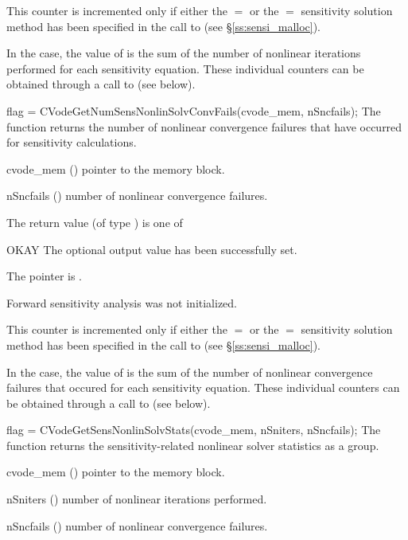 {
  This counter is incremented only if either the $=$ or 
  the $=$ sensitivity solution method has been specified 
  in the call to  (see \S\ref{ss:sensi_malloc}).
  
  In the  case, the value of  is the sum of 
  the number of nonlinear iterations performed for each sensitivity equation.
  These individual counters can be obtained through a call to
   (see below).
}
{
  flag = CVodeGetNumSensNonlinSolvConvFails(cvode\_mem, nSncfails);
}
{
  The function  returns the
  number of nonlinear convergence failures that have occurred for
  sensitivity calculations.
}
{
  \begin{args}
  \item[cvode\_mem] ()
    pointer to the {\cvodes} memory block.
  \item[nSncfails] ()
    number of nonlinear convergence failures.
  \end{args}
}
{
  The return value  (of type ) is one of
  \begin{args}
  \item[OKAY] 
    The optional output value has been successfully set.
  \item[\Id{CVG\_NO\_MEM}]
    The  pointer is .
  \item[\Id{CVG\_NO\_SENS}]
    Forward sensitivity analysis was not initialized.
  \end{args}
}
{
  This counter is incremented only if either the $=$ or 
  the $=$ sensitivity solution method has been specified 
  in the call to  (see \S\ref{ss:sensi_malloc}).
  
  In the  case, the value of  is the sum of 
  the number of nonlinear convergence failures that occured for each sensitivity equation.
  These individual counters can be obtained through a call to
   (see below).
}
{
  flag = CVodeGetSensNonlinSolvStats(cvode\_mem, nSniters, nSncfails);
}
{
  The function  returns the sensitivity-related
  nonlinear solver statistics as a group.
}
{
  \begin{args}
  \item[cvode\_mem] ()
    pointer to the {\cvodes} memory block.
  \item[nSniters] ()
    number of nonlinear iterations performed.
  \item[nSncfails] ()
    number of nonlinear convergence failures.
  \end{args}
}
